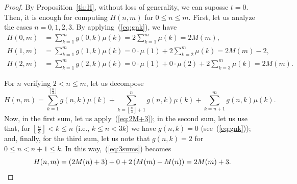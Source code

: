 \documentclass[10pt]{amsart}
\begin{document}
\begin{proof}
By Proposition~\ref{th:H}, without loss of generality, we can suposse $t=0$.
Then, it is enough for computing $H(n,m)$ for $0\leq n\leq m$.
First, let us analyze the cases $n=0,1,2,3$. By applying~(\ref{eq:gnk}), we have
\begin{align*}
H(0,m) &= \sum_{k=1}^m g(0,k)\mu(k) = 2\sum_{k=1}^m \mu(k) = 2M(m),
\\
H(1,m) &= \sum_{k=1}^m g(1,k)\mu(k) = 0\cdot \mu(1)+2\sum_{k=2}^m \mu(k) = 2M(m)-2,
\\
H(2,m) &= \sum_{k=1}^m g(2,k)\mu(k)
= 0\cdot \mu(1) + 0\cdot\mu(2) + 2\sum_{k=3}^m \mu(k) = 2M(m).
\end{align*}

For $n$ verifying $2 < n\leq m$, let us decompose
\begin{equation}
\label{eq:3sums}
H(n,m) = \sum_{k=1}^{\lfloor\frac n3\rfloor} g(n,k)\mu(k)
+ \sum_{k=\left\lfloor\frac n3\right\rfloor+1}^n g(n,k)\mu(k)
+ \sum_{k=n+1}^m g(n,k)\mu(k).
\end{equation}
Now, in the first sum, let us apply~(\ref{eq:2M+3});
in the second sum, let us use that, for
$\left\lfloor\frac n3\right\rfloor < k\leq n$ (i.e., $k\leq n<3k$)
we have $g(n,k)=0$ (see~(\ref{eq:gnk})); and, finally,
for the third sum, let us note that $g(n,k)=2$ for $0\leq n<n+1\leq k$.
In this way,~(\ref{eq:3sums}) becomes
\begin{equation*}
H(n,m) = (2M(n)+3) + 0 + 2\left(M(m)-M(n)\right) = 2M(m)+3.
\qedhere
\end{equation*}
\end{proof}
\end{document}
